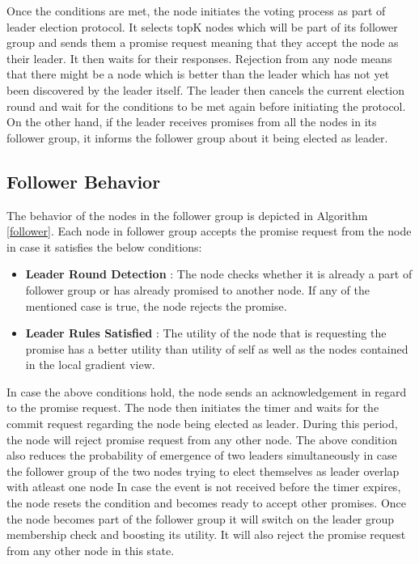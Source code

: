 \documentclass[a4paper,11pt]{kth-mag}
\begin{document}
Once the conditions are met, the node initiates the voting process as part of leader election protocol. It selects topK nodes which will be part of  its follower group and sends them a promise request meaning that they accept the node as their leader. It then waits for their responses. Rejection from any node means that there might be a node which is better than the leader which has not yet been discovered by the leader itself. The leader then cancels the current election round and wait for the conditions to be met again before initiating the protocol.
On the other hand, if the leader receives promises from all the nodes in its follower group, it informs the follower group about it being elected as leader.


\subsection{Follower Behavior}

The behavior of the nodes in the follower group is depicted in Algorithm \ref{follower}. Each node in follower group accepts the promise request from the node in case it satisfies the below conditions:

\begin{itemize}

\item \textbf{Leader Round Detection} : The node checks whether it is already a part of follower group or has already promised to another node. If any of the mentioned case is true, the node rejects the promise.

\item \textbf{Leader Rules Satisfied} : The utility of the node that is requesting the promise has a better utility than utility of self as well as the nodes contained in the local gradient view.

\end{itemize}

In case the above conditions hold, the node sends an acknowledgement in regard to the promise request. The node then initiates the timer and waits for the commit request regarding the node being elected as leader. During this period, the node will reject promise request from any other node. The above condition also reduces the probability of emergence of two leaders simultaneously in case the follower group of the two nodes trying to elect themselves as leader overlap with atleast one node In case the event is not received before the timer expires, the node resets the condition and becomes ready to accept other promises. Once the node becomes part of the follower group it will switch on the leader group membership check and boosting its utility. It will also reject the promise request from any other node in this state.
\end{document}
